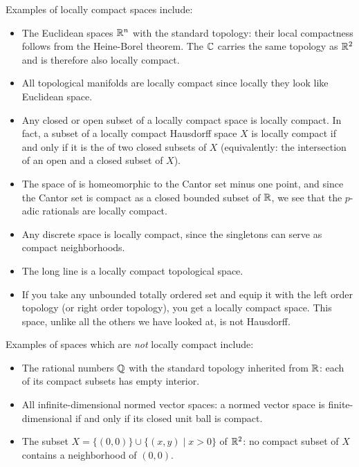 \documentclass[12pt]{article}
\begin{document}

Examples of locally compact spaces include:

\begin{itemize}

\item The Euclidean spaces $\Bbb{R}^n$ with the standard topology: their local compactness follows from the Heine-Borel theorem. The  $\Bbb{C}$ carries the same topology as $\Bbb{R}^2$ and is therefore also locally compact. 

\item All topological manifolds are locally compact since locally they look like Euclidean space.

\item Any closed or open subset of a locally compact space is locally compact. In fact, a subset of a locally compact Hausdorff space $X$ is locally compact if and only if it is the  of two closed subsets of $X$ (equivalently: the intersection of an open and a closed subset of $X$).

\item The space of  is homeomorphic to the Cantor set minus one point, and since the Cantor set is compact as a closed bounded subset of $\Bbb{R}$, we see that the $p$-adic rationals are locally compact.

\item Any discrete space is locally compact, since the singletons can serve as compact neighborhoods.

\item The long line is a locally compact topological space.

\item If you take any unbounded totally ordered set and equip it with the left order topology (or right order topology), you get a locally compact space. This space, unlike all the others we have looked at, is not Hausdorff.

\end{itemize}

Examples of spaces which are \emph{not} locally compact include:

\begin{itemize}

\item The rational numbers $\Bbb{Q}$ with the standard topology inherited from $\Bbb{R}$: each of its compact subsets has empty interior.

\item All infinite-dimensional normed vector spaces: a normed vector space is finite-dimensional if and only if its closed unit ball is compact.

\item The subset $X=\{(0,0)\}\cup\{(x,y)\mid x>0\}$ of $\Bbb{R}^2$: no compact 
subset of $X$ contains a neighborhood of $(0,0)$.

\end{itemize}
\end{document}
